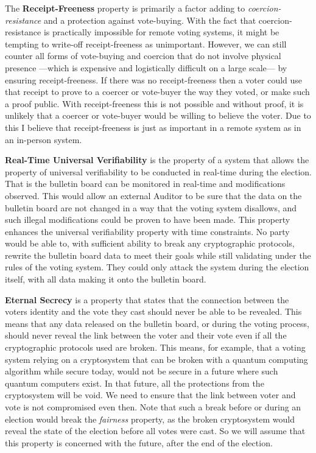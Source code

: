 The \textbf{Receipt-Freeness} property is primarily a factor adding to \emph{coercion-resistance} and a protection against vote-buying. With the fact that coercion-resistance is practically impossible for remote voting systems, it might be tempting to write-off receipt-freeness as unimportant. However, we can still counter all forms of vote-buying and coercion that do not involve physical presence ---which is expensive and logistically difficult on a large scale--- by ensuring receipt-freeness. If there was no receipt-freeness then a voter could use that receipt to prove to a coercer or vote-buyer the way they voted, or make such a proof public. With receipt-freeness this is not possible and without proof, it is unlikely that a coercer or vote-buyer would be willing to believe the voter. Due to this I believe that receipt-freeness is just as important in a remote system as in an in-person system.

\textbf{Real-Time Universal Verifiability} is the property of a system that allows the property of universal verifiability to be conducted in real-time during the election. That is the bulletin board can be monitored in real-time and modifications observed. This would allow an external Auditor to be sure that the data on the bulletin board are not changed in a way that the voting system disallows, and such illegal modifications could be proven to have been made. This property enhances the universal verifiability property with time constraints. No party would be able to, with sufficient ability to break any cryptographic protocols, rewrite the bulletin board data to meet their goals while still validating under the rules of the voting system. They could only attack the system during the election itself, with all data making it onto the bulletin board.

\textbf{Eternal Secrecy} is a property that states that the connection between the voters identity and the vote they cast should never be able to be revealed. This means that any data released on the bulletin board, or during the voting process, should never reveal the link between the voter and their vote even if all the cryptographic protocols used are broken. This means, for example, that a voting system relying on a cryptosystem that can be broken with a quantum computing algorithm while secure today, would not be secure in a future where such quantum computers exist. In that future, all the protections from the cryptosystem will be void. We need to ensure that the link between voter and vote is not compromised even then. Note that such a break before or during an election would break the \emph{fairness} property, as the broken cryptosystem would reveal the state of the election before all votes were cast. So we will assume that this property is concerned with the future, after the end of the election.



